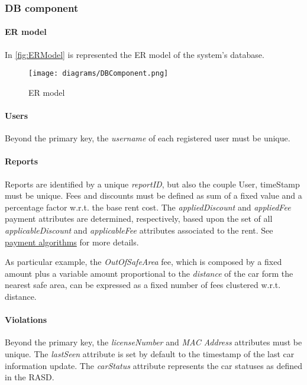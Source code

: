 \subsubsection{DB component}
\paragraph{ER model}In \autoref{fig:ERModel} is represented the ER model of the system's database.

\begin{figure}[h!]
	\hspace*{-0.7cm}
	\centering
	\texttt{[image: diagrams/DBComponent.png]}
	\caption{
		\label{fig:ERModel} 
		ER model
	}
\end{figure}

\paragraph{Users} Beyond the primary key, the \mbox{\emph{username}} of each registered user must be unique.

\paragraph{Reports}
Reports are identified by a unique \emph{reportID}, but also the couple User, timeStamp must be unique.
Fees and discounts must be defined as sum of a fixed value and a percentage factor w.r.t. the base rent cost.
The \emph{appliedDiscount} and \emph{appliedFee} payment attributes are determined, respectively, based upon the set of all \emph{applicableDiscount} and \emph{applicableFee} attributes associated to the rent. See \hyperref[sec:paymentAlgorithms]{payment algorithms} for more details.

As particular example, the \emph{OutOfSafeArea} fee, which is composed by a fixed amount plus a variable amount proportional to the \emph{distance} of the car form the nearest safe area, can be expressed as a fixed number of fees clustered w.r.t. distance.

\paragraph{Violations}Beyond the primary key, the \mbox{\emph{licenseNumber}} and \emph{MAC Address} attributes must be unique. The \mbox{\emph{lastSeen}} attribute is set by default to the timestamp of the last car information update. The \mbox{\emph{carStatus}} attribute represents the car statuses as defined in the RASD.

